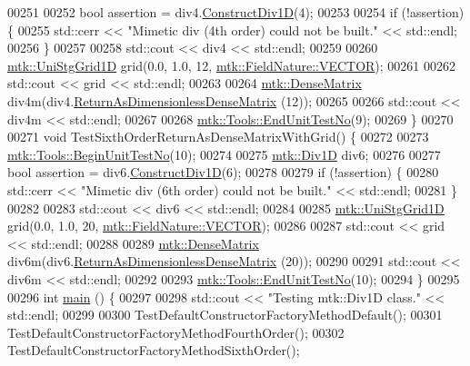 \begin{DoxyCode}
00251 
00252   \textcolor{keywordtype}{bool} assertion = div4.\hyperlink{classmtk_1_1Div1D_a52fcd1542f11e606e36bd188e48bfdf7}{ConstructDiv1D}(4);
00253 
00254   \textcolor{keywordflow}{if} (!assertion) \{
00255     std::cerr << \textcolor{stringliteral}{"Mimetic div (4th order) could not be built."} << std::endl;
00256   \}
00257 
00258   std::cout << div4 << std::endl;
00259 
00260   \hyperlink{classmtk_1_1UniStgGrid1D}{mtk::UniStgGrid1D} grid(0.0, 1.0, 12, \hyperlink{namespacemtk_ga4c54f2a329cfb4e56213b02a259d19e2a87752381b583740610f1dfeb07fdad7e}{mtk::FieldNature::VECTOR});
00261 
00262   std::cout << grid << std::endl;
00263 
00264   \hyperlink{classmtk_1_1DenseMatrix}{mtk::DenseMatrix} div4m(div4.\hyperlink{classmtk_1_1Div1D_af2546ad1568ef39a6075f03bb395719e}{ReturnAsDimensionlessDenseMatrix}
      (12));
00265 
00266   std::cout << div4m << std::endl;
00267 
00268   \hyperlink{classmtk_1_1Tools_aba67d9dc35c9c1c49430fcc9ea035e03}{mtk::Tools::EndUnitTestNo}(9);
00269 \}
00270 
00271 \textcolor{keywordtype}{void} TestSixthOrderReturnAsDenseMatrixWithGrid() \{
00272 
00273   \hyperlink{classmtk_1_1Tools_afc29ecaf337a13ed2e817d3890a5a441}{mtk::Tools::BeginUnitTestNo}(10);
00274 
00275   \hyperlink{classmtk_1_1Div1D}{mtk::Div1D} div6;
00276 
00277   \textcolor{keywordtype}{bool} assertion = div6.\hyperlink{classmtk_1_1Div1D_a52fcd1542f11e606e36bd188e48bfdf7}{ConstructDiv1D}(6);
00278 
00279   \textcolor{keywordflow}{if} (!assertion) \{
00280     std::cerr << \textcolor{stringliteral}{"Mimetic div (6th order) could not be built."} << std::endl;
00281   \}
00282 
00283   std::cout << div6 << std::endl;
00284 
00285   \hyperlink{classmtk_1_1UniStgGrid1D}{mtk::UniStgGrid1D} grid(0.0, 1.0, 20, \hyperlink{namespacemtk_ga4c54f2a329cfb4e56213b02a259d19e2a87752381b583740610f1dfeb07fdad7e}{mtk::FieldNature::VECTOR});
00286 
00287   std::cout << grid << std::endl;
00288 
00289   \hyperlink{classmtk_1_1DenseMatrix}{mtk::DenseMatrix} div6m(div6.\hyperlink{classmtk_1_1Div1D_af2546ad1568ef39a6075f03bb395719e}{ReturnAsDimensionlessDenseMatrix}
      (20));
00290 
00291   std::cout << div6m << std::endl;
00292 
00293   \hyperlink{classmtk_1_1Tools_aba67d9dc35c9c1c49430fcc9ea035e03}{mtk::Tools::EndUnitTestNo}(10);
00294 \}
00295 
00296 \textcolor{keywordtype}{int} \hyperlink{mtk__div__1d__test_8cc_ae66f6b31b5ad750f1fe042a706a4e3d4}{main} () \{
00297 
00298   std::cout << \textcolor{stringliteral}{"Testing mtk::Div1D class."} << std::endl;
00299 
00300   TestDefaultConstructorFactoryMethodDefault();
00301   TestDefaultConstructorFactoryMethodFourthOrder();
00302   TestDefaultConstructorFactoryMethodSixthOrder();

\end{DoxyCode}
